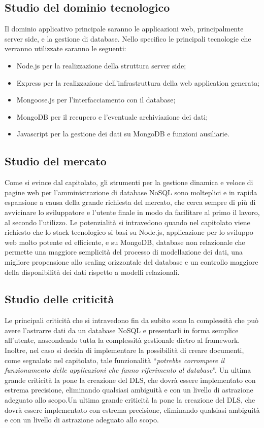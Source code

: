 \subsection{Studio del dominio tecnologico} %
\label{2.2}
Il dominio applicativo principale saranno le applicazioni web, principalmente server side, e la gestione di database.
Nello specifico le principali tecnologie che verranno utilizzate saranno le seguenti:
\begin{itemize}
\item Node.js per la realizzazione della struttura server side;
\item Express per la realizzazione dell’infrastruttura della web application generata;
\item Mongoose.js  per l’interfacciamento con il database;
\item MongoDB per il recupero e l’eventuale archiviazione dei dati;
\item Javascript per la gestione dei dati su MongoDB e funzioni ausiliarie.
\end{itemize}
\subsection{Studio del mercato} 
\label{2.3}
Come si evince dal capitolato, gli strumenti per la gestione dinamica e veloce di pagine web per l’amministrazione di database NoSQL sono molteplici e in rapida espansione a causa della grande richiesta del mercato, che cerca sempre di più di avvicinare lo sviluppatore e l’utente finale in modo da facilitare al primo il lavoro, al secondo l’utilizzo. Le potenzialità si intravedono quando nel capitolato viene richiesto che lo stack tecnologico si basi su Node.js, applicazione per lo sviluppo web molto potente ed efficiente, e su MongoDB, database non relazionale che permette una maggiore semplicità del processo di modellazione dei dati, una migliore propensione allo scaling orizzontale del database e un controllo maggiore della disponibilità dei dati rispetto a modelli relazionali.
\subsection{Studio delle criticità} 
\label{2.4}
Le principali criticità che si intravedono fin da subito sono la complessità che può avere l’astrarre dati da un database NoSQL e presentarli in forma semplice all’utente, nascondendo tutta la complessità gestionale dietro al framework. 
Inoltre, nel caso si decida di implementare la possibilità di creare documenti, come segnalato nel capitolato, tale funzionalità “\emph {potrebbe corrompere il funzionamento delle applicazioni che fanno riferimento al database}”.
Un ultima grande criticità la pone la creazione del DLS, che dovrà essere implementato con estrema precisione, eliminando qualsiasi ambiguità e con un  livello di astrazione adeguato allo scopo.Un ultima grande criticità la pone la creazione del DLS, che dovrà essere implementato con estrema precisione, eliminando qualsiasi ambiguità e con un  livello di astrazione adeguato allo scopo.
